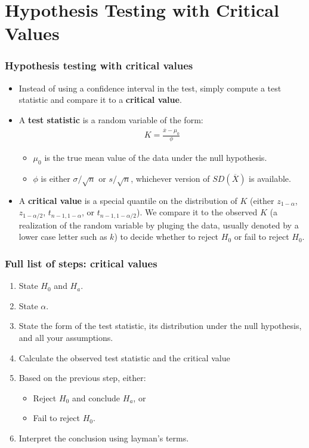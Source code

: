 \documentclass[handout]{beamer}\usepackage[]{graphicx}\usepackage[]{color}
\providecommand{\ov}[1]{\overline{#1}}
\numberwithin{equation}{section}
\begin{document}
\section{Hypothesis Testing with Critical Values}

\begin{frame}
\frametitle{Hypothesis testing with critical values}
\begin{itemize}
\item Instead of using a confidence interval in the test, simply compute a test statistic and compare it to a {\bf critical value}.
\pause \item A {\bf test statistic} is a random variable of the form: 
\begin{align*}
K = \frac{\ov{x} - \mu_0}{\phi}
\end{align*}
\begin{itemize}
\pause \item $\mu_0$ is the true mean value of the data under the null hypothesis.
\pause \item $\phi$ is either $\sigma/\sqrt{n}$ or $s/\sqrt{n}$, whichever version of $SD(\ov{X})$ is available.
\end{itemize}
\pause \item A {\bf critical value} is a special quantile on the distribution of $K$ (either $z_{1 - \alpha}$, $z_{1 - \alpha/2}$, $t_{n - 1, 1 - \alpha}$, or $t_{n - 1, 1 - \alpha/2}$). We compare it to the observed $K$ (a realization of the random variable by pluging the data, usually denoted by a lower case letter such as $k$) to decide whether to reject $H_0$ or fail to reject $H_0$.
\end{itemize}
\end{frame}


\begin{frame}
\frametitle{Full list of steps: critical values}
\begin{enumerate}[1. ]
\item State $H_0$ and $H_a$.
\pause \item State $\alpha$.
\pause \item State the form of the test statistic, its distribution under the null hypothesis, and all your assumptions.
\pause \item Calculate the observed test statistic and the critical value
\pause \item Based on the previous step, either:
\begin{itemize}
\pause \item Reject $H_0$ and conclude $H_a$, or
\pause \item Fail to reject $H_0$.
\end{itemize}
\pause \item Interpret the conclusion using layman's terms.
\end{enumerate}
\end{frame}
\end{document}
